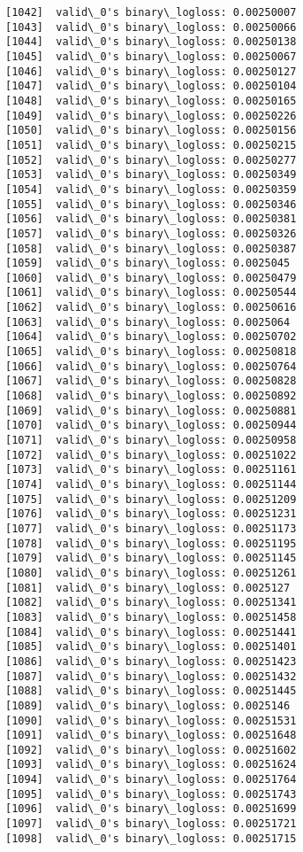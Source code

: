 \documentclass[11pt]{article}
\begin{document}
\begin{Verbatim}[commandchars=\\\{\}]
[1042]	valid\_0's binary\_logloss: 0.00250007
[1043]	valid\_0's binary\_logloss: 0.00250066
[1044]	valid\_0's binary\_logloss: 0.00250138
[1045]	valid\_0's binary\_logloss: 0.00250067
[1046]	valid\_0's binary\_logloss: 0.00250127
[1047]	valid\_0's binary\_logloss: 0.00250104
[1048]	valid\_0's binary\_logloss: 0.00250165
[1049]	valid\_0's binary\_logloss: 0.00250226
[1050]	valid\_0's binary\_logloss: 0.00250156
[1051]	valid\_0's binary\_logloss: 0.00250215
[1052]	valid\_0's binary\_logloss: 0.00250277
[1053]	valid\_0's binary\_logloss: 0.00250349
[1054]	valid\_0's binary\_logloss: 0.00250359
[1055]	valid\_0's binary\_logloss: 0.00250346
[1056]	valid\_0's binary\_logloss: 0.00250381
[1057]	valid\_0's binary\_logloss: 0.00250326
[1058]	valid\_0's binary\_logloss: 0.00250387
[1059]	valid\_0's binary\_logloss: 0.0025045
[1060]	valid\_0's binary\_logloss: 0.00250479
[1061]	valid\_0's binary\_logloss: 0.00250544
[1062]	valid\_0's binary\_logloss: 0.00250616
[1063]	valid\_0's binary\_logloss: 0.0025064
[1064]	valid\_0's binary\_logloss: 0.00250702
[1065]	valid\_0's binary\_logloss: 0.00250818
[1066]	valid\_0's binary\_logloss: 0.00250764
[1067]	valid\_0's binary\_logloss: 0.00250828
[1068]	valid\_0's binary\_logloss: 0.00250892
[1069]	valid\_0's binary\_logloss: 0.00250881
[1070]	valid\_0's binary\_logloss: 0.00250944
[1071]	valid\_0's binary\_logloss: 0.00250958
[1072]	valid\_0's binary\_logloss: 0.00251022
[1073]	valid\_0's binary\_logloss: 0.00251161
[1074]	valid\_0's binary\_logloss: 0.00251144
[1075]	valid\_0's binary\_logloss: 0.00251209
[1076]	valid\_0's binary\_logloss: 0.00251231
[1077]	valid\_0's binary\_logloss: 0.00251173
[1078]	valid\_0's binary\_logloss: 0.00251195
[1079]	valid\_0's binary\_logloss: 0.00251145
[1080]	valid\_0's binary\_logloss: 0.00251261
[1081]	valid\_0's binary\_logloss: 0.0025127
[1082]	valid\_0's binary\_logloss: 0.00251341
[1083]	valid\_0's binary\_logloss: 0.00251458
[1084]	valid\_0's binary\_logloss: 0.00251441
[1085]	valid\_0's binary\_logloss: 0.00251401
[1086]	valid\_0's binary\_logloss: 0.00251423
[1087]	valid\_0's binary\_logloss: 0.00251432
[1088]	valid\_0's binary\_logloss: 0.00251445
[1089]	valid\_0's binary\_logloss: 0.0025146
[1090]	valid\_0's binary\_logloss: 0.00251531
[1091]	valid\_0's binary\_logloss: 0.00251648
[1092]	valid\_0's binary\_logloss: 0.00251602
[1093]	valid\_0's binary\_logloss: 0.00251624
[1094]	valid\_0's binary\_logloss: 0.00251764
[1095]	valid\_0's binary\_logloss: 0.00251743
[1096]	valid\_0's binary\_logloss: 0.00251699
[1097]	valid\_0's binary\_logloss: 0.00251721
[1098]	valid\_0's binary\_logloss: 0.00251715

\end{Verbatim}
\end{document}
